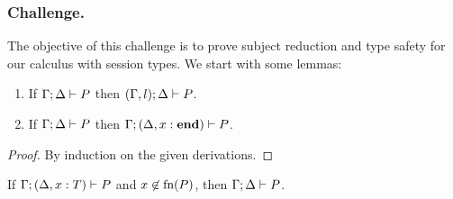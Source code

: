 \subsubsection{Challenge.}
The objective of this challenge is to prove subject reduction and type safety for our calculus with session types. We start with some lemmas:

\begin{lemma}[Weakening]\mbox{}
  \label{lemma:weak}
  \begin{enumerate}
  \item If \( \Gamma; \Delta \vdash P \) then
    \( (\Gamma, l);\Delta \vdash P \).
  \item If \( \Gamma; \Delta \vdash P \) %
    then
    \( \Gamma;(\Delta, x : \mathbf{end}) \vdash P \).
  \end{enumerate}
\end{lemma}
\begin{proof}
  By induction on the given derivations.
\end{proof}
\begin{lemma}[Strengthening]\mbox{}
  \label{lemma:strenD}
  If \( \Gamma; (\Delta, x : T) \vdash P \) and
  $x\not\in \textrm{fn}(P)$, then \( \Gamma; \Delta \vdash P \).
\end{lemma}
